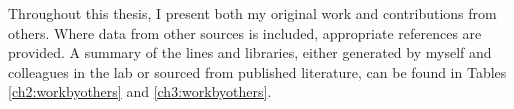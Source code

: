 
\begin{declaration}

Throughout this thesis, I present both my original work and contributions from others. Where data from other sources is included, appropriate references are provided. A summary of the lines and libraries, either generated by myself and colleagues in the lab or sourced from published literature, can be found in Tables \ref{ch2:workbyothers} and \ref{ch3:workbyothers}.

\end{declaration}


